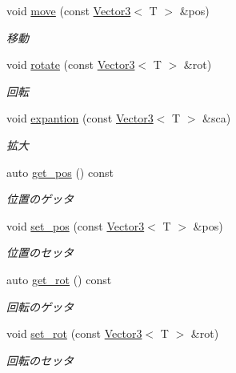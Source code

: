 \begin{DoxyCompactItemize}
\item 
void \mbox{\hyperlink{classsaki_1_1_transform_a1c0f7ad966d8f4d014e6f023943bbfb7}{move}} (const \mbox{\hyperlink{classsaki_1_1_vector3}{Vector3}}$<$ T $>$ \&pos)
\begin{DoxyCompactList}\small\item\em 移動 \end{DoxyCompactList}\item 
void \mbox{\hyperlink{classsaki_1_1_transform_aa46a720684261bebf4305724817ac053}{rotate}} (const \mbox{\hyperlink{classsaki_1_1_vector3}{Vector3}}$<$ T $>$ \&rot)
\begin{DoxyCompactList}\small\item\em 回転 \end{DoxyCompactList}\item 
void \mbox{\hyperlink{classsaki_1_1_transform_a58885f17529b9c32308ec826d67a82fd}{expantion}} (const \mbox{\hyperlink{classsaki_1_1_vector3}{Vector3}}$<$ T $>$ \&sca)
\begin{DoxyCompactList}\small\item\em 拡大 \end{DoxyCompactList}\item 
auto \mbox{\hyperlink{classsaki_1_1_transform_a781a14da529aa0a45d4cfb66768ffc8c}{get\+\_\+pos}} () const
\begin{DoxyCompactList}\small\item\em 位置のゲッタ \end{DoxyCompactList}\item 
void \mbox{\hyperlink{classsaki_1_1_transform_a2659fe0773c0b8137b3a321859c3906e}{set\+\_\+pos}} (const \mbox{\hyperlink{classsaki_1_1_vector3}{Vector3}}$<$ T $>$ \&pos)
\begin{DoxyCompactList}\small\item\em 位置のセッタ \end{DoxyCompactList}\item 
auto \mbox{\hyperlink{classsaki_1_1_transform_ab5a091567c4f9f3040c0f843156d8bce}{get\+\_\+rot}} () const
\begin{DoxyCompactList}\small\item\em 回転のゲッタ \end{DoxyCompactList}\item 
void \mbox{\hyperlink{classsaki_1_1_transform_a7b30f864722819b8be85ecbd4dde43a4}{set\+\_\+rot}} (const \mbox{\hyperlink{classsaki_1_1_vector3}{Vector3}}$<$ T $>$ \&rot)
\begin{DoxyCompactList}\small\item\em 回転のセッタ \end{DoxyCompactList}\item 

\end{DoxyCompactItemize}
